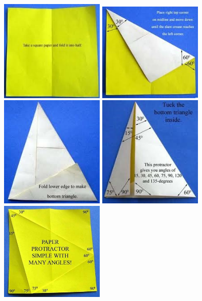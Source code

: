 	\begin{center}
	\includegraphics[width=5cm]{./img/prot1.jpg}
	\includegraphics[width=5cm]{./img/prot2.jpg}
	\includegraphics[width=5cm]{./img/prot3.jpg}
	\includegraphics[width=5cm]{./img/prot4.jpg}
	\includegraphics[width=5cm]{./img/prot5.jpg}
	\end{center}

